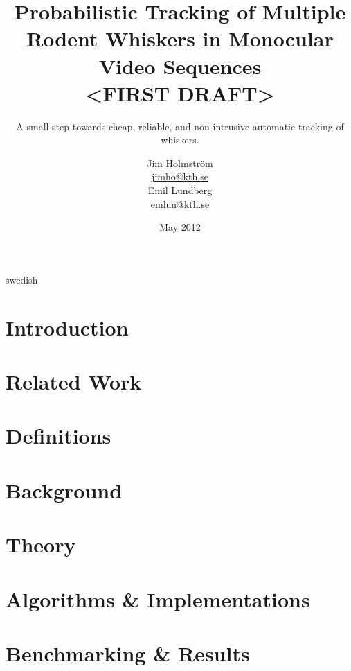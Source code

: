 \documentclass[a4paper,11pt]{kth-mag}
\title{
    Probabilistic Tracking of Multiple Rodent Whiskers in Monocular Video
    Sequences\\ <FIRST DRAFT>
}
\subtitle{
    A small step towards cheap, reliable, and non-intrusive automatic tracking of whiskers.
}
\author{
    Jim Holmström\\
    \href{mailto:jimho@kth.se}{jimho@kth.se}\\
    Emil Lundberg\\
    \href{mailto:emlun@kth.se}{emlun@kth.se}
}
\date{May 2012}
\theoremstyle{definition}
\begin{document}
\frontmatter
\pagestyle{empty}
\removepagenumbers
\maketitle
{}
\begin{abstract}
    
\end{abstract}
\clearpage
\begin{foreignabstract}{swedish}
    
\end{foreignabstract}
\clearpage
\tableofcontents*
\mainmatter
\pagestyle{newchap}
\chapter{Introduction}
    \label{sec:introduction}
    

\chapter{Related Work}
    \label{sec:related_work}
    

\chapter{Definitions}
    \label{sec:definitions}
    

\chapter{Background}
    \label{sec:Background}
    

\chapter{Theory}
    \label{sec:theory}
    


\chapter{Algorithms \& Implementations}
    \label{sec:algorithms_implementations}
    


\chapter{Benchmarking \& Results}
    \label{sec:benchmarks_results}
    
\end{document}
